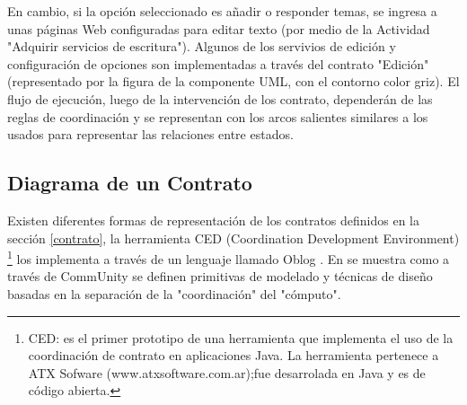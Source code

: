 \documentclass[12 pt,a4paper]{llncs}
\begin{document}
En cambio, si la opción seleccionado es añadir o responder temas, se ingresa a unas páginas Web configuradas para editar texto (por medio de la Actividad "Adquirir servicios de escritura"). Algunos de los servivios de edición y configuración de opciones son implementadas a través del contrato "Edición" (representado por la figura de la componente UML, con el contorno color griz). El flujo de ejecución, luego de la intervención de los contrato, dependerán de las reglas de coordinación y se representan con los arcos salientes similares a los usados para representar las relaciones entre estados.


\subsection{Diagrama de un Contrato}

Existen diferentes formas de representación de los contratos definidos en la sección \ref{contrato}, la herramienta  CED (Coordination Development Environment) \footnote{CED: es el primer prototipo de una herramienta que implementa el uso de la coordinación de contrato en aplicaciones Java. La herramienta pertenece a ATX Sofware (www.atxsoftware.com.ar);fue desarrolada en Java y es de código abierta.} los implementa a través de un lenguaje llamado Oblog \cite{lenguajeoblog}. En \cite{communit} se muestra como a través de CommUnity se definen primitivas de modelado y técnicas de diseño basadas en la separación de la "coordinación" del "cómputo". 
\end{document}
